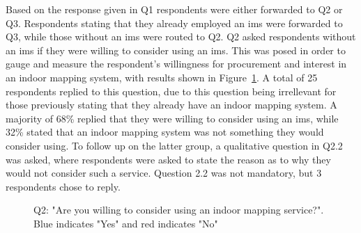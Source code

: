 Based on the response given in Q1 respondents were either forwarded to Q2 or Q3. Respondents stating that they already employed an \gls{ims} were forwarded to Q3, while those without an \gls{ims} were routed to Q2. Q2 asked respondents without an \gls{ims} if they were willing to consider using an \gls{ims}. This was posed in order to gauge and measure the respondent's willingness for procurement and interest in an indoor mapping system, with results shown in Figure~\ref{fig:q2}. A total of 25 respondents replied to this question, due to this question being irrellevant for those previously stating that they already have an indoor mapping system. A majority of 68\% replied that they were willing to consider using an \gls{ims}, while 32\% stated that an indoor mapping system was not something they would consider using. To follow up on the latter group, a qualitative question in Q2.2 was asked, where respondents were asked to state the reason as to why they would not consider such a service. Question 2.2 was not mandatory, but 3 respondents chose to reply.    


\begin{figure}[H]
    \centering
    \caption{Q2: "Are you willing to consider using an indoor mapping service?". Blue indicates "Yes" and red indicates "No"}
    \label{fig:q2}
\end{figure}


